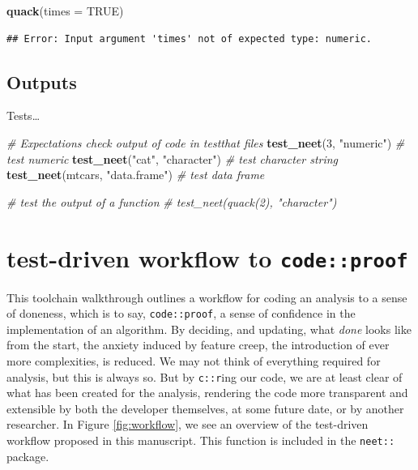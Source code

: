 \documentclass[
]{article}
\newenvironment{Shaded}{\begin{snugshade}}{\end{snugshade}}
\newcommand{\CommentTok}[1]{\textcolor[rgb]{0.56,0.35,0.01}{\textit{#1}}}
\newcommand{\DataTypeTok}[1]{\textcolor[rgb]{0.13,0.29,0.53}{#1}}
\newcommand{\DecValTok}[1]{\textcolor[rgb]{0.00,0.00,0.81}{#1}}
\newcommand{\KeywordTok}[1]{\textcolor[rgb]{0.13,0.29,0.53}{\textbf{#1}}}
\newcommand{\NormalTok}[1]{#1}
\newcommand{\OtherTok}[1]{\textcolor[rgb]{0.56,0.35,0.01}{#1}}
\newcommand{\StringTok}[1]{\textcolor[rgb]{0.31,0.60,0.02}{#1}}
\begin{document}
\begin{Shaded}
\begin{Highlighting}[]
\KeywordTok{quack}\NormalTok{(}\DataTypeTok{times =} \OtherTok{TRUE}\NormalTok{)}
\end{Highlighting}
\end{Shaded}

\begin{verbatim}
## Error: Input argument 'times' not of expected type: numeric.
\end{verbatim}

\hypertarget{outputs}{%
\subsection{Outputs}\label{outputs}}

Tests\ldots{}

\begin{Shaded}
\begin{Highlighting}[]
\CommentTok{\# Expectations check output of code in testthat files}
\KeywordTok{test\_neet}\NormalTok{(}\DecValTok{3}\NormalTok{, }\StringTok{"numeric"}\NormalTok{) }\CommentTok{\# test numeric}
\KeywordTok{test\_neet}\NormalTok{(}\StringTok{"cat"}\NormalTok{, }\StringTok{"character"}\NormalTok{) }\CommentTok{\# test character string}
\KeywordTok{test\_neet}\NormalTok{(mtcars, }\StringTok{"data.frame"}\NormalTok{) }\CommentTok{\# test data frame}

\CommentTok{\# test the output of a function}
\CommentTok{\# test\_neet(quack(2), "character")}
\end{Highlighting}
\end{Shaded}

\hypertarget{test-driven-workflow-to-codeproof}{%
\section{\texorpdfstring{test-driven workflow to \texttt{code::proof}}{test-driven workflow to code::proof}}\label{test-driven-workflow-to-codeproof}}

This toolchain walkthrough outlines a workflow for coding an analysis to a sense of doneness, which is to say, \texttt{code::proof}, a sense of confidence in the implementation of an algorithm. By deciding, and updating, what \emph{done} looks like from the start, the anxiety induced by feature creep, the introduction of ever more complexities, is reduced. We may not think of everything required for analysis, but this is always so. But by \texttt{c::r}ing our code, we are at least clear of what has been created for the analysis, rendering the code more transparent and extensible by both the developer themselves, at some future date, or by another researcher. In Figure \ref{fig:workflow}, we see an overview of the test-driven workflow proposed in this manuscript. This function is included in the \texttt{neet::} package.
\end{document}
